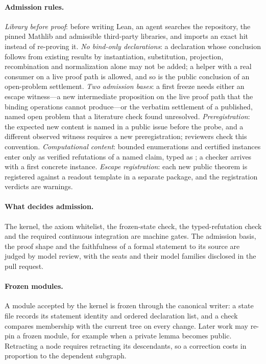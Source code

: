 \documentclass[11pt]{article}
\newcommand{\code}[1]{\texttt{\detokenize{#1}}}
\begin{document}
\paragraph{Admission rules.}
\emph{Library before proof}: before writing Lean, an agent searches the
repository, the pinned Mathlib and admissible third-party libraries, and
imports an exact hit instead of re-proving it. \emph{No bind-only
declarations}: a declaration whose conclusion follows from existing results
by instantiation, substitution, projection, recombination and normalization
alone may not be added; a helper with a real consumer on a live proof path is
allowed, and so is the public conclusion of an open-problem settlement.
\emph{Two admission bases}: a first freeze needs either an escape witness---a
new intermediate proposition on the live proof path that the binding
operations cannot produce---or the verbatim settlement of a published, named
open problem that a literature check found unresolved.
\emph{Preregistration}: the expected new content is named in a public issue
before the probe, and a different observed witness requires a new
preregistration; reviewers check this convention. \emph{Computational
content}: bounded enumerations and certified instances enter only as verified
refutations of a named claim, typed as \code{Not claim}; a checker arrives
with a first concrete instance. \emph{Escape registration}: each new public
theorem is registered against a readout template in a separate package, and
the registration verdicts are warnings.

\paragraph{What decides admission.} The kernel, the axiom whitelist, the
frozen-state check, the typed-refutation check and the required continuous
integration are machine gates. The admission basis, the proof shape and the
faithfulness of a formal statement to its source are judged by model review,
with the seats and their model families disclosed in the pull request.

\paragraph{Frozen modules.} A module accepted by the kernel is frozen through
the canonical writer: a state file records its statement identity and ordered
declaration list, and a check compares membership with the current tree on
every change. Later work may re-pin a frozen module, for example when a
private lemma becomes public. Retracting a node requires retracting its
descendants, so a correction costs in proportion to the dependent subgraph.
\end{document}
